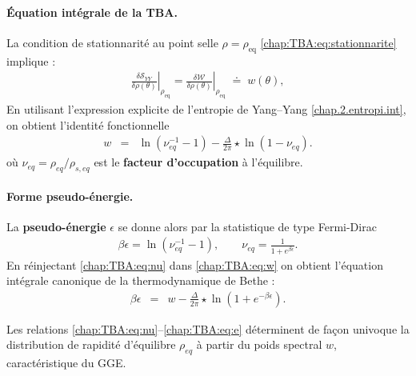 \paragraph{Équation intégrale de la TBA.}

La condition de stationnarité au point selle \(\rho=\rho_{\mathrm{eq}}\) \eqref{chap:TBA:eq:stationnarite} implique :
\begin{eqnarray}
	\left.\frac{\delta\mathcal{S}_{YY}}{\delta\rho(\theta)}\right|_{\rho_{\mathrm{eq}}} = \left.\frac{\delta\mathcal{W}}{\delta\rho(\theta)}\right|_{\rho_{\mathrm{eq}}}\;\doteq\;w(\theta),
\end{eqnarray}
En utilisant l’expression explicite de l’entropie de Yang–Yang \eqref{chap.2.entropi.int}, on obtient l’identité fonctionnelle
\begin{eqnarray}
	w & = & \ln ( \nu_{\!eq}^{-1}  - 1 ) - \frac{\Delta}{2\pi} \star \ln ( 1 -  \nu_{\!eq}).\label{chap:TBA:eq:w}
\end{eqnarray}
où
\(
\nu_{\!eq}=\rho_{\!eq}/\rho_{s,\!eq}
\)
est le \textbf{facteur d’occupation} à l’équilibre.
\paragraph{Forme pseudo-énergie.}
La \textbf{pseudo-énergie} $\epsilon$ se donne alors par la statistique de type Fermi-Dirac
\begin{eqnarray}
	\beta \epsilon =\ln(\nu^{-1}_{\!eq}-1),\qquad\nu_{\!eq}=\frac{1}{1+e^{\beta \epsilon}}.\label{chap:TBA:eq:nu}%
\end{eqnarray}
En réinjectant \eqref{chap:TBA:eq:nu} dans \eqref{chap:TBA:eq:w} on obtient
l’équation intégrale canonique de la thermodynamique de Bethe :
\begin{eqnarray}
	\beta \epsilon & = & w - \frac{\Delta}{2\pi} \star \ln ( 1  + e^{-\beta \epsilon}).\label{chap:TBA:eq:e}%
\end{eqnarray}

Les relations \eqref{chap:TBA:eq:nu}–\eqref{chap:TBA:eq:e} déterminent de façon univoque la distribution de rapidité d’équilibre \(\rho_{\!eq}\) à partir du poids spectral \(w\), caractéristique du GGE.

